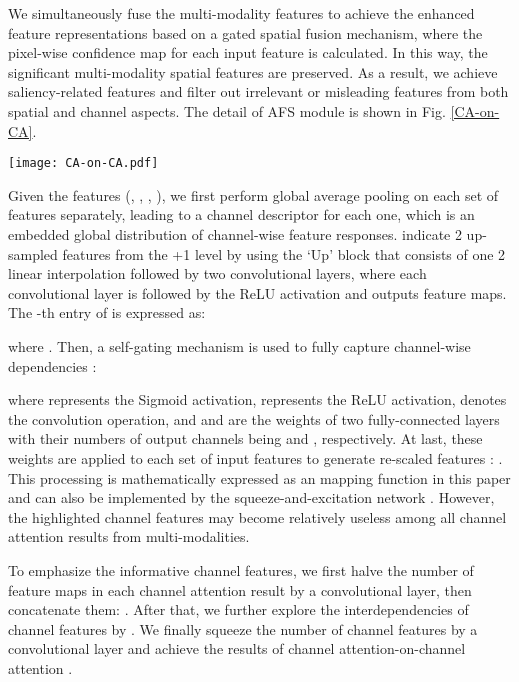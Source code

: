 \documentclass[runningheads]{llncs}
\begin{document}
We simultaneously fuse the multi-modality features to achieve the enhanced feature representations based on a gated spatial fusion mechanism, where the pixel-wise confidence map for each input feature is calculated. In this way, the significant multi-modality spatial features are preserved. As a result, we achieve saliency-related features and filter out irrelevant or misleading features from both  spatial and channel aspects. The detail of AFS module is shown in Fig. \ref{CA-on-CA}.

\begin{figure*}[!t]
	\centering
	\texttt{[image: CA-on-CA.pdf]}
	\caption{\textbf{The detail of AFS module}. `Cat' represents the concatenation operation. `SE-Net' is the squeeze-and-excitation network.}
	\label{CA-on-CA}
\end{figure*}


Given the features (, , , ), we first perform global average pooling on each set of features separately, leading to a channel descriptor  for each one, which is an embedded global distribution of channel-wise feature responses.  indicate 2 up-sampled features from the +1 level by using the `Up' block that consists of one 2 linear interpolation followed by two convolutional layers, where each convolutional layer is followed by the ReLU activation and outputs  feature maps. The -th entry of  is expressed as:

where . Then, a self-gating mechanism is used to fully capture channel-wise dependencies :

where  represents the Sigmoid activation,   represents the ReLU activation,  denotes the convolution operation, and  and  are the weights of two fully-connected layers with their numbers of output channels being  and , respectively. At last, these weights are applied to each set of input features  to generate re-scaled features   : .
This processing is mathematically expressed as an  mapping function in this paper and  can also be implemented by the squeeze-and-excitation network \cite{ChannelAtt}. However, the highlighted channel features may become relatively useless among all channel attention results from multi-modalities.

To emphasize the informative channel features, we first halve the number of feature maps in each channel attention result by a convolutional layer, then concatenate them: .
After that, we further explore the interdependencies of channel features by .
We finally squeeze the number of channel features by a convolutional layer and achieve the results of channel attention-on-channel attention  .
\end{document}
